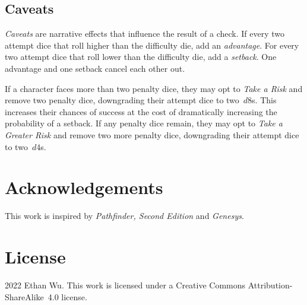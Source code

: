 \documentclass[twocolumn]{article}
\begin{document}
\subsection{Caveats}
\emph{Caveats} are narrative effects that influence the result of a check. If
every two attempt dice that roll higher than the difficulty die, add an
\emph{advantage}. For every two attempt dice that roll lower than the difficulty
die, add a \emph{setback}. One advantage and one setback cancel each other out.

If a character faces more than two penalty dice, they may opt to \emph{Take a
Risk} and remove two penalty dice, downgrading their attempt dice to two~$d8$s.
This increases their chances of success at the cost of dramatically increasing
the probability of a setback. If any penalty dice remain, they may opt to
\emph{Take a Greater Risk} and remove two more penalty dice, downgrading their
attempt dice to two~$d4$s.

\section{Acknowledgements}
This work is inspired by \emph{Pathfinder, Second Edition} and \emph{Genesys}.

\section{License}
\textcopyright{} 2022 Ethan Wu. This work is licensed under a Creative Commons
Attribution-ShareAlike~4.0 license. \ccbysa
\end{document}
